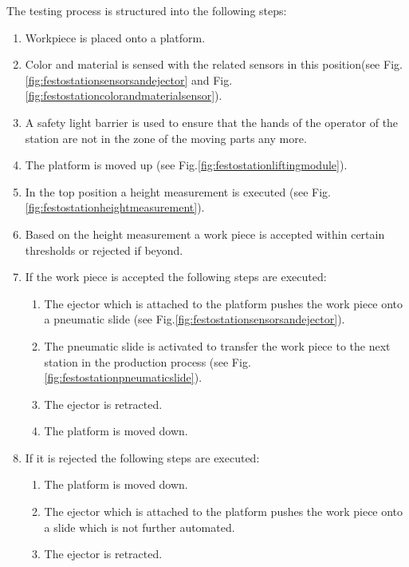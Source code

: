 The testing process is structured into the following steps:
\begin{enumerate}[noitemsep]
	\item Workpiece is placed onto a platform.
	\item Color and material is sensed with the related sensors in this position(see Fig. \ref{fig:festostationsensorsandejector} and Fig.\ref{fig:festostationcolorandmaterialsensor}).
	\item A safety light barrier is used to ensure that the hands of the operator of the station are not in the zone of the moving parts any more.
	\item The platform is moved up (see Fig.\ref{fig:festostationliftingmodule}).
	\item In the top position a height measurement is executed (see Fig.\ref{fig:festostationheightmeasurement}).
	\item Based on the height measurement a work piece is accepted within certain thresholds or rejected if beyond.
	\item If the work piece is accepted the following steps are executed:
	\begin{enumerate}
		\item The ejector which is attached to the platform pushes the work piece onto a pneumatic slide (see Fig.\ref{fig:festostationsensorsandejector}). 
		\item The pneumatic slide is activated to transfer the work piece to the next station in the production process (see Fig.\ref{fig:festostationpneumaticslide}).
		\item The ejector is retracted.
		\item The platform is moved down.
	\end{enumerate} 
	\item If it is rejected the following steps are executed:
	\begin{enumerate}
		\item The platform is moved down.
		\item The ejector which is attached to the platform pushes the work piece onto a  slide which is not further automated.
		\item The ejector is retracted.
	\end{enumerate}
\end{enumerate}


